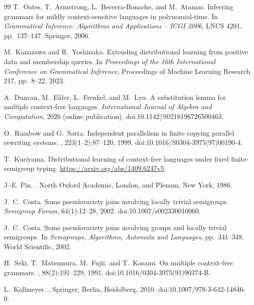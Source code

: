 \begin{thebibliography}{99}
T.~Oates, T.~Armstrong, L.~Becerra-Bonache, and M.~Atamas.
\newblock Inferring grammars for mildly context-sensitive languages in polynomial-time.
\newblock In {\em Grammatical Inference: Algorithms and Applications -- ICGI 2006},
LNCS 4201, pp.~137--147. Springer, 2006.

M.~Kanazawa and R.~Yoshinaka.
\newblock Extending distributional learning from positive data and membership queries.
\newblock In {\em Proceedings of the 16th International Conference on Grammatical Inference},
Proceedings of Machine Learning Research 217, pp.~8--22, 2023.

A.~Duncan, M.~Elder, L.~Frenkel, and M.~Lyu.
\newblock A substitution lemma for multiple context-free languages.
\newblock \emph{International Journal of Algebra and Computation},
2026 (online publication).
\newblock doi:10.1142/S0218196726500463.

O.~Rambow and G.~Satta.
\newblock Independent parallelism in finite copying parallel rewriting systems.
, 223(1--2):87--120, 1999.
\newblock doi:10.1016/S0304-3975(97)00190-4.

T.~Kuriyama.
\newblock Distributional learning of context-free languages under fixed
finite-semigroup typing.
\newblock \url{https://arxiv.org/abs/1409.6247v5}.

J.-E. Pin.
.
\newblock North Oxford Academic, London, and Plenum, New York, 1986.

J.~C.~Costa.
\newblock Some pseudovariety joins involving locally trivial semigroups.
\newblock \emph{Semigroup Forum}, 64(1):12--28, 2002.
\newblock doi:10.1007/s002330010060.

J.~C.~Costa.
\newblock Some pseudovariety joins involving groups and locally trivial semigroups.
\newblock In \emph{Semigroups, Algorithms, Automata and Languages},
pp.~341--348. World Scientific, 2002.

H.~Seki, T.~Matsumura, M.~Fujii, and T.~Kasami.
\newblock On multiple context-free grammars.
, 88(2):191--229, 1991.
\newblock doi:10.1016/0304-3975(91)90374-B.

L.~Kallmeyer.
.
\newblock Springer, Berlin, Heidelberg, 2010.
\newblock doi:10.1007/978-3-642-14846-0.


\end{thebibliography}
